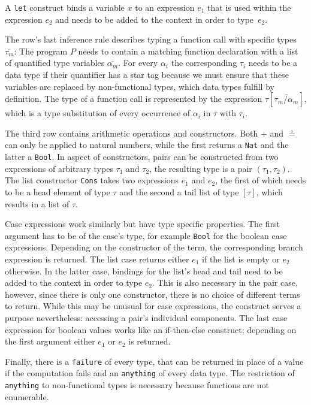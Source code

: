 \documentclass[paper = a4, fleqn, abstract=on, twoside]{scrreprt}
\begin{document}
A \texttt{let} construct binds a variable $x$ to an expression $e_{1}$ that is used within the expression $e_{2}$ and needs to be added to the context in order to \mbox{type $e_{2}$}.
\par
The row's last inference rule describes typing a function call with specific types $\overline{\tau_{m}}$: The program $P$ needs to contain a matching function declaration with a list of quantified type variables $\overline{\alpha_{m}}$. For every $\alpha_{i}$ the corresponding $\tau_{i}$ needs to be a data type if their quantifier has a star tag because we must ensure that these variables are replaced by non-functional types, which data types fulfill by definition. The type of a function call is represented by the expression $\tau [\overline{\tau_{m}/\alpha_{m}}]$, which is a type substitution of every occurrence of $\alpha_{i}$ in $\tau$ with $\tau_{i}$.
\par
The third row contains arithmetic operations and constructors. Both $+$ and $\circeq$ can only be applied to natural numbers, while the first returns a \texttt{Nat} and the latter a \texttt{Bool}. In aspect of constructors, pairs can be constructed from two expressions of arbitrary types $\tau_{1}$ and $\tau_{2}$, the resulting type is a pair $(\tau_{1}, \tau_{2})$. The list constructor \texttt{Cons} takes two expressions $e_{1}$ and $e_{2}$, the first of which needs to be a head element of type $\tau$ and the second a tail list of type $[\tau]$, which results in a list of $\tau$.
\par
Case expressions work similarly but have type specific properties. The first argument has to be of the case's type, for example \texttt{Bool} for the boolean case expressions. Depending on the constructor of the term, the corresponding branch expression is returned. The list case returns either $e_{1}$ if the list is empty or $e_{2}$ otherwise. In the latter case, bindings for the list's head and tail need to be added to the context in order to type $e_{2}$. This is also necessary in the pair case, however, since there is only one constructor, there is no choice of different terms to return. While this may be unusual for case expressions, the construct serves a purpose nevertheless: accessing a pair's individual components. The last case expression for boolean values works like an if-then-else construct; depending on the first argument either $e_{1}$ or $e_{2}$ is returned.
\par
Finally, there is a \texttt{failure} of every type, that can be returned in place of a value if the computation fails and an \texttt{anything} of every data type. The restriction of \texttt{anything} to non-functional types is necessary because functions are not enumerable.\\
\end{document}
